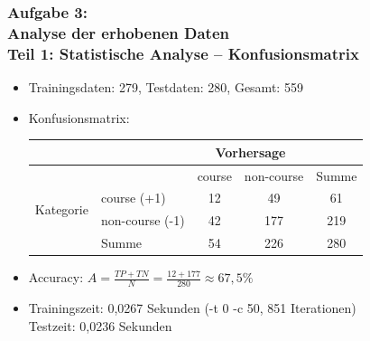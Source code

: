 \documentclass[accentcolor=tud7b,noresetcounter]{tudbeamer}
\begin{document}
	\begin{frame}
		\frametitle{Aufgabe 3:\\ Analyse der erhobenen Daten\\ Teil 1: Statistische Analyse -- Konfusionsmatrix}
		\begin{itemize}
			\item Trainingsdaten: 279, Testdaten: 280, Gesamt: 559
			\item Konfusionsmatrix: \\
			\begin{tabular}{|l|l|c|c||c|}
		\hline
			& & \multicolumn{2}{c|}{Vorhersage} & \\
			\hline
			& & course & non-course & Summe \\
			\hline
		\multirow{2}{*}{Kategorie} & course (+1) & 12 & 49 & 61\\
		\cline{2-5}
		& non-course (-1) & 42 & 177 & 219\\
		\hline
		& Summe & 54 & 226 & 280 \\
		\hline
		\end{tabular}
			\item Accuracy: $A = \frac{TP + TN}{N} = \frac{12+177}{280} \approx 67,5\%$
			\item Trainingszeit: 0,0267 Sekunden (-t 0 -c 50, 851 Iterationen)\\
				Testzeit: 0,0236 Sekunden
		\end{itemize}

		

	\end{frame}
	
	\newcommand{\plotOf}[3]{
 \resizebox {0.9\columnwidth} {!} {
	  \begin{tikzpicture}
	  
	    \begin{axis}[
	    axis lines=middle,
	    axis line style={->},
	    x label style={at={(axis description cs:0.5,-0.1)},anchor=north},
	    y label style={at={(axis description cs:-0.1,.5)},rotate=90,anchor=south},
	    xlabel={#1},
	    ylabel={#2},
	    xmin=0,
	    xmax=10000,
	    ]
	    \addplot table [x=features, y=#3,col sep=semicolon]
	    {../Aufg03/3.3result.csv};
	  \end{axis}
	  \end{tikzpicture}
	  }
}
	
\end{document}

